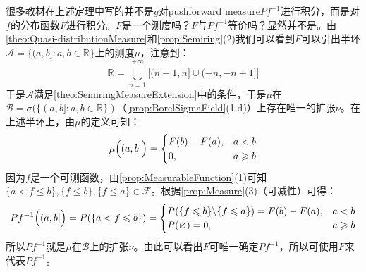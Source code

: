 \begin{note}
	很多教材在上述定理中写的并不是$g$对pushforward measure$Pf^{-1}$进行积分，而是对$f$的分布函数$F$进行积分。$F$是一个测度吗？$F$与$Pf^{-1}$等价吗？显然并不是。由\cref{theo:Quasi-distributionMeasure}和\cref{prop:Semiring}(2)我们可以看到$F$可以引出半环$\mathscr{A}=\{(a,b]:a,b\in\mathbb{R}^{}\}$上的测度$\mu$，注意到：
	\begin{equation*}
		\mathbb{R}^{}=\underset{n=1}{\overset{+\infty}{\bigcup}}\Big[(n-1,n]\cup(-n,-n+1]\Big]
	\end{equation*}
	于是$\mathscr{A}$满足\cref{theo:SemiringMeasureExtension}中的条件，于是$\mu$在$\mathcal{B}=\sigma(\{(a,b]:a,b\in\mathbb{R}^{}\})$（\cref{prop:BorelSigmaField}(1.d)）上存在唯一的扩张$\nu$。在上述半环上，由$\mu$的定义可知：
	\begin{equation*}
		\mu\Bigl((a,b]\Bigr)=
		\begin{cases}
			F(b)-F(a),&a<b \\
			0,&a\geqslant b
		\end{cases}
	\end{equation*}
	因为$f$是一个可测函数，由\cref{prop:MeasurableFunction}(1)可知$\{a<f\leqslant b\},\{f\leqslant b\},\{f\leqslant a\}\in\mathscr{F}$。根据\cref{prop:Measure}(3)（可减性）可得：
	\begin{equation*}
		Pf^{-1}\Bigl((a,b]\Bigr)=P(\{a<f\leqslant b\})=
		\begin{cases}
			P(\{f\leqslant b\}\backslash\{f\leqslant a\})=F(b)-F(a),&a<b \\
			P(\varnothing)=0,&a\geqslant b
		\end{cases}
	\end{equation*}
	所以$Pf^{-1}$就是$\mu$在$\mathcal{B}$上的扩张$\nu$。由此可以看出$F$可唯一确定$Pf^{-1}$，所以可使用$F$来代表$Pf^{-1}$。
\end{note}

